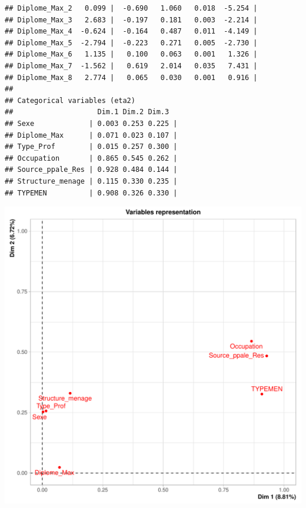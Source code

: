 \documentclass[11pt,a4paper, x11names]{article}\usepackage[]{graphicx}\usepackage[]{color}
\makeatletter
\def\maxwidth{ %
  \ifdim\Gin@nat@width>\linewidth
    \linewidth
  \else
    \Gin@nat@width
  \fi
}
\newenvironment{kframe}{%
 \def\at@end@of@kframe{}%
 \ifinner\ifhmode%
  \def\at@end@of@kframe{\end{minipage}}%
  \begin{minipage}{\columnwidth}%
 \fi\fi%
 \def\FrameCommand##1{\hskip\@totalleftmargin \hskip-\fboxsep
 \colorbox{shadecolor}{##1}\hskip-\fboxsep
     \hskip-\linewidth \hskip-\@totalleftmargin \hskip\columnwidth}%
 \MakeFramed {\advance\hsize-\width
   \@totalleftmargin\z@ \linewidth\hsize
   \@setminipage}}%
 {\par\unskip\endMakeFramed%
 \at@end@of@kframe}
\newenvironment{knitrout}{}{} %
\makeatother
\begin{document}
\begin{knitrout}
\begin{kframe}
\begin{verbatim}
## Diplome_Max_2   0.099 |  -0.690   1.060   0.018  -5.254 |
## Diplome_Max_3   2.683 |  -0.197   0.181   0.003  -2.214 |
## Diplome_Max_4  -0.624 |  -0.164   0.487   0.011  -4.149 |
## Diplome_Max_5  -2.794 |  -0.223   0.271   0.005  -2.730 |
## Diplome_Max_6   1.135 |   0.100   0.063   0.001   1.326 |
## Diplome_Max_7  -1.562 |   0.619   2.014   0.035   7.431 |
## Diplome_Max_8   2.774 |   0.065   0.030   0.001   0.916 |
## 
## Categorical variables (eta2)
##                    Dim.1 Dim.2 Dim.3  
## Sexe             | 0.003 0.253 0.225 |
## Diplome_Max      | 0.071 0.023 0.107 |
## Type_Prof        | 0.015 0.257 0.300 |
## Occupation       | 0.865 0.545 0.262 |
## Source_ppale_Res | 0.928 0.484 0.144 |
## Structure_menage | 0.115 0.330 0.235 |
## TYPEMEN          | 0.908 0.326 0.330 |
\end{verbatim}


{\ttfamily\noindent\bfseries{}}\end{kframe}
\includegraphics[width=\maxwidth]{figure/Analyse_factorielle-5} 
\end{knitrout}




\end{document}
